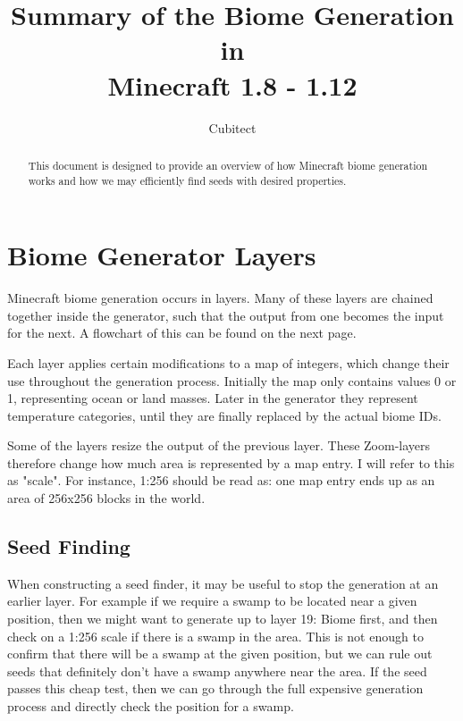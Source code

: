 \documentclass{article}
\title{Summary of the Biome Generation in \\ Minecraft 1.8 - 1.12}
\author{Cubitect}
\begin{document}
	
	\maketitle
	
	\begin{abstract}
		This document is designed to provide an overview of how Minecraft biome generation works and how we may efficiently find seeds with desired properties.
	\end{abstract}
	
	\newpage
	
	\tableofcontents
	
	
	
	\newpage
	
	
	\section{Biome Generator Layers}

	Minecraft biome generation occurs in layers. Many of these layers are chained together inside the generator, such that the output from one becomes the input for the next. A flowchart of this can be found on the next page.
	
	Each layer applies certain modifications to a map of integers, which change their use throughout the generation process. Initially the map only contains values 0 or 1, representing ocean or land masses. Later in the generator they represent temperature categories, until they are finally replaced by the actual biome IDs.
	
	Some of the layers resize the output of the previous layer. These Zoom-layers therefore change how much area is represented by a map entry. I will refer to this as "scale". For instance, 1:256 should be read as: one map entry ends up as an area of 256x256 blocks in the world.
	
	\setcounter{subsection}{-1}
	\subsection{Seed Finding}
	
	When constructing a seed finder, it may be useful to stop the generation at an earlier layer. For example if we require a swamp to be located near a given position, then we might want to generate up to layer 19: Biome first, and then check on a 1:256 scale if there is a swamp in the area. This is not enough to confirm that there will be a swamp at the given position, but we can rule out seeds that definitely don't have a swamp anywhere near the area. If the seed passes this cheap test, then we can go through the full expensive generation process and directly check the position for a swamp.
	
\end{document}
